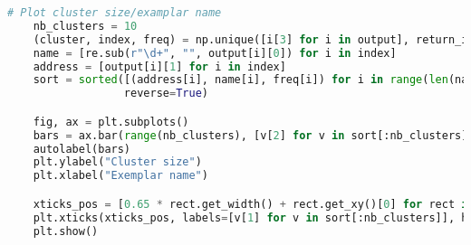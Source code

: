 \begin{lstlisting}[language=Python]
    # Plot cluster size/examplar name
    nb_clusters = 10
    (cluster, index, freq) = np.unique([i[3] for i in output], return_index=True, return_counts=True)
    name = [re.sub(r"\d+", "", output[i][0]) for i in index]
    address = [output[i][1] for i in index]
    sort = sorted([(address[i], name[i], freq[i]) for i in range(len(name))], key=lambda c: c[2],
                  reverse=True)

    fig, ax = plt.subplots()
    bars = ax.bar(range(nb_clusters), [v[2] for v in sort[:nb_clusters]], label=[v[1] for v in sort[:nb_clusters]])
    autolabel(bars)
    plt.ylabel("Cluster size")
    plt.xlabel("Exemplar name")

    xticks_pos = [0.65 * rect.get_width() + rect.get_xy()[0] for rect in bars]
    plt.xticks(xticks_pos, labels=[v[1] for v in sort[:nb_clusters]], ha='right', rotation=45)
    plt.show()
    \end{lstlisting}